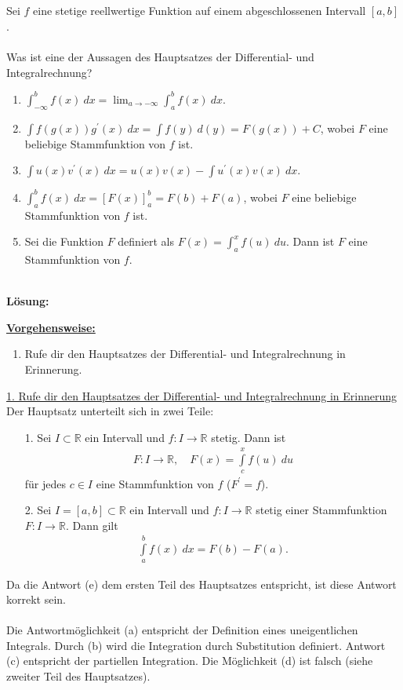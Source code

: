 \subsection*{}
Sei $f$ eine stetige reellwertige Funktion auf einem abgeschlossenen Intervall $[a,b]$.\\
\\
Was ist eine der Aussagen des Hauptsatzes der Differential- und Integralrechnung?
\renewcommand{\labelenumi}{(\alph{enumi})}
\begin{enumerate}
	\item 
	$\int_{-\infty}^b f(x) \ dx = 
	\lim_{a \to -\infty} \int_{a}^b f(x) \ dx
	$.
	\item 
	$\int f(g(x)) g^\prime(x) \ dx
	= \int f(y) \ d(y)
	= F(g(x) ) + C
	$, wobei $F$ eine beliebige Stammfunktion von $f$ ist.
	\item 
	$\int u(x) v^\prime(x) \ dx = u(x) v(x)  - \int u^\prime(x) v(x) \ dx$.
	\item 
	$\int_a^b f(x) \ dx
	=\left[F(x)\right]_a^b= F(b) +F(a)
	$, wobei $F$ eine beliebige Stammfunktion von $f$ ist.
	\item 
	Sei die Funktion $F$ definiert als $F(x) = \int_a^x f(u) \ du$.
	Dann ist $F$ eine Stammfunktion von $f$.
\end{enumerate}
\ \\
\textbf{Lösung:}
\begin{mdframed}
\underline{\textbf{Vorgehensweise:}}
\renewcommand{\labelenumi}{\theenumi.}
\begin{enumerate}
\item Rufe dir den Hauptsatzes der Differential- und Integralrechnung in Erinnerung.
\end{enumerate}
\end{mdframed}

\underline{1. Rufe dir den Hauptsatzes der Differential- und Integralrechnung in Erinnerung}\\
Der Hauptsatz unterteilt sich in zwei Teile:
\begin{enumerate}
	\item[1.] 
	Sei $I \subset \mathbb{R}  $ ein Intervall und $f : I \to \mathbb{R}$ stetig.
	Dann ist
	\begin{align*}
		F : I \to \mathbb{R}, \quad F(x) = \int \limits_{c}^x f(u) \ du
	\end{align*}
	für jedes $c \in I $ eine Stammfunktion von $f$ ($F^\prime = f$).
	\item[2.]
	Sei $I = [a,b] \subset \mathbb{R} $ ein Intervall und $f: I \to \mathbb{R}$ stetig einer Stammfunktion $F : I \to \mathbb{R}$. Dann gilt
	\begin{align*}
		\int \limits_a^b f(x) \ dx = F(b) - F(a).
	\end{align*}
\end{enumerate}
Da die Antwort (e) dem ersten Teil des Hauptsatzes entspricht, ist diese Antwort korrekt sein.\\
\\
Die Antwortmöglichkeit (a) entspricht der Definition eines uneigentlichen Integrals.
Durch (b) wird die Integration durch Substitution definiert. Antwort (c) entspricht der partiellen Integration. 
Die Möglichkeit (d) ist falsch (siehe zweiter Teil des Hauptsatzes). 


